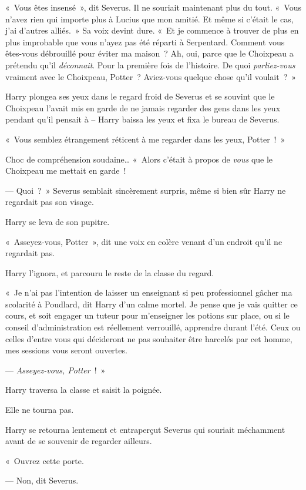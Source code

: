 «~Vous êtes insensé~», dit Severus.
Il ne souriait maintenant plus du tout.
«~Vous n'avez rien qui importe plus à Lucius que mon amitié.
Et même si c'était le cas, j'ai d'autres alliés.~»
Sa voix devint dure.
«~Et je commence à trouver de plus en plus improbable que vous n'ayez pas été réparti à Serpentard.
Comment vous êtes-vous débrouillé pour éviter ma maison~?
Ah, oui, parce que le Choixpeau a prétendu qu'il \emph{déconnait}.
Pour la première fois de l'histoire.
De quoi \emph{parliez-vous} vraiment avec le Choixpeau, Potter~?
Aviez-vous quelque chose qu'il voulait~?~»

Harry plongea ses yeux dans le regard froid de Severus et se souvint que le Choixpeau l'avait mis en garde de ne jamais regarder des gens dans les yeux pendant qu'il pensait à -- Harry baissa les yeux et fixa le bureau de Severus.

«~Vous semblez étrangement réticent à me regarder dans les yeux, Potter~!~»

Choc de compréhension soudaine…
«~Alors c'était à propos de \emph{vous} que le Choixpeau me mettait en garde~!

--- Quoi~?~» Severus semblait sincèrement surpris, même si bien sûr Harry ne regardait pas son visage.

Harry se leva de son pupitre.

«~Asseyez-vous, Potter~», dit une voix en colère venant d'un endroit qu'il ne regardait pas.

Harry l'ignora, et parcouru le reste de la classe du regard.

«~Je n'ai pas l'intention de laisser un enseignant si peu professionnel gâcher ma scolarité à Poudlard, dit Harry d'un calme mortel.
Je pense que je vais quitter ce cours, et soit engager un tuteur pour m'enseigner les potions sur place, ou si le conseil d'administration est réellement verrouillé, apprendre durant l'été.
Ceux ou celles d'entre vous qui décideront ne pas souhaiter être harcelés par cet homme, mes sessions vous seront ouvertes.

--- \emph{Asseyez-vous, Potter}~!~»

Harry traversa la classe et saisit la poignée.

Elle ne tourna pas.

Harry se retourna lentement et entraperçut Severus qui souriait méchamment avant de se souvenir de regarder ailleurs.

«~Ouvrez cette porte.

--- Non, dit Severus.

